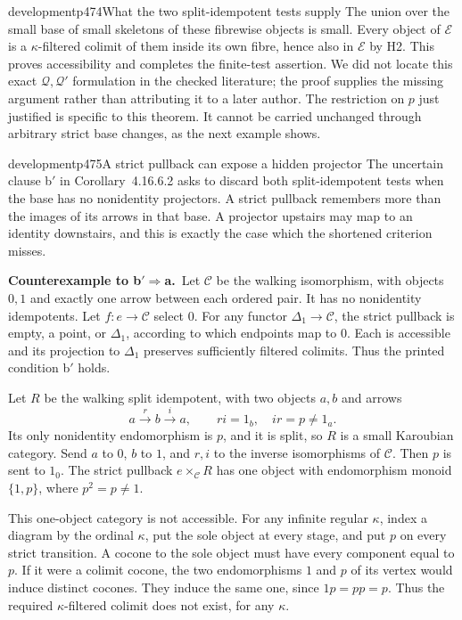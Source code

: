 \begin{dcomment}{development}{p474}{What the two split-idempotent tests supply}
The union over the small base of small skeletons of these fibrewise objects is small. Every object of $\mathcal E$ is a $\kappa$-filtered colimit of them inside its own fibre, hence also in $\mathcal E$ by H2. This proves accessibility and completes the finite-test assertion. We did not locate this exact $\mathcal Q,\mathcal Q'$ formulation in the checked literature; the proof supplies the missing argument rather than attributing it to a later author. The restriction on $p$ just justified is specific to this theorem. It cannot be carried unchanged through arbitrary strict base changes, as the next example shows.
\end{dcomment}

\begin{dcomment}{development}{p475}{A strict pullback can expose a hidden projector}
The uncertain clause b$'$ in Corollary~4.16.6.2 asks to discard both split-idempotent tests when the base has no nonidentity projectors. A strict pullback remembers more than the images of its arrows in that base. A projector upstairs may map to an identity downstairs, and this is exactly the case which the shortened criterion misses.

\textbf{Counterexample to b$'\Rightarrow$a.}\ours\
Let $\mathcal C$ be the walking isomorphism, with objects $0,1$ and exactly one arrow between each ordered pair. It has no nonidentity idempotents. Let $f:e\to\mathcal C$ select $0$. For any functor $\Delta_1\to\mathcal C$, the strict pullback is empty, a point, or $\Delta_1$, according to which endpoints map to $0$. Each is accessible and its projection to $\Delta_1$ preserves sufficiently filtered colimits. Thus the printed condition b$'$ holds.

Let $R$ be the walking split idempotent, with two objects $a,b$ and arrows
\[
 a\xrightarrow{r}b\xrightarrow{i}a,
 \qquad ri=1_b,\quad ir=p\ne1_a.
\]
Its only nonidentity endomorphism is $p$, and it is split, so $R$ is a small Karoubian category. Send $a$ to $0$, $b$ to $1$, and $r,i$ to the inverse isomorphisms of $\mathcal C$. Then $p$ is sent to $1_0$. The strict pullback $e\times_{\mathcal C}R$ has one object with endomorphism monoid $\{1,p\}$, where $p^2=p\ne1$.

This one-object category is not accessible. For any infinite regular $\kappa$, index a diagram by the ordinal $\kappa$, put the sole object at every stage, and put $p$ on every strict transition. A cocone to the sole object must have every component equal to $p$. If it were a colimit cocone, the two endomorphisms $1$ and $p$ of its vertex would induce distinct cocones. They induce the same one, since $1p=pp=p$. Thus the required $\kappa$-filtered colimit does not exist, for any $\kappa$.


\end{dcomment}
